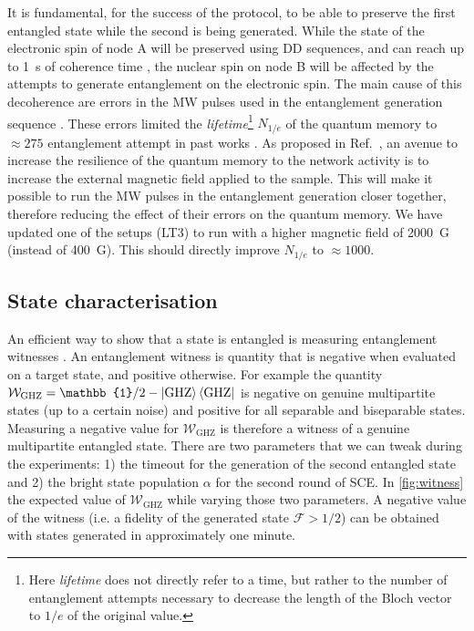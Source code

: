 \documentclass[a4paper, twoside]{article}
\begin{document}
It is fundamental, for the success of the protocol, to be able to preserve the first entangled state while the second is being generated. While the state of the electronic spin of node A will be preserved using \ac{DD} sequences, and can reach up to \SI{1}{s} of coherence time \cite{Abobeih2018}, the nuclear spin on node B will be affected by the attempts to generate entanglement on the electronic spin. The main cause of this decoherence are errors in the \ac{MW} pulses used in the entanglement generation sequence \cite{Kalb2018}. These errors limited the \emph{lifetime}\footnote{Here \emph{lifetime} does not directly refer to a time, but rather to the number of entanglement attempts necessary to decrease the length of the Bloch vector to $1/e$ of the original value.} $N_{1/e}$ of the quantum memory to $\approx 275$ entanglement attempt in past works \cite{Kalb2017}. As proposed in Ref.~\cite{Kalb2018}, an avenue to increase the resilience of the quantum memory to the network activity is to increase the external magnetic field applied to the sample. This will make it possible to run the \ac{MW} pulses in the entanglement generation closer together, therefore reducing the effect of their errors on the quantum memory. We have updated one of the setups (LT3) to run with a higher magnetic field of \SI{2000}{G} (instead of \SI{400}{G}). This should directly improve $N_{1/e}$ to $\approx 1000$.

\subsection{State characterisation}

An efficient way to show that a state is entangled is measuring entanglement witnesses \cite{Guehne2009}. An entanglement witness is quantity that is negative when evaluated on a target state, and positive otherwise. For example the quantity $\mathcal W_\text{GHZ} = \mathbb{1}/2 - \ket{\text{GHZ}}\bra{\text{GHZ}}$ is negative on genuine multipartite states (up to a certain noise) and positive for all separable and biseparable states. Measuring a negative value for $\mathcal W_\text{GHZ}$ is therefore a witness of a genuine multipartite entangled state. There are two parameters that we can tweak during the experiments: 1) the timeout for the generation of the second entangled state and 2) the bright state population $\alpha$ for the second round of \ac{SCE}. In \autoref{fig:witness} the expected value of $\mathcal W_\text{GHZ}$ while varying those two parameters. A negative value of the witness (i.e. a fidelity of the generated state $\mathcal{F} > 1/2$) can be obtained with states generated in approximately one minute.
\end{document}
